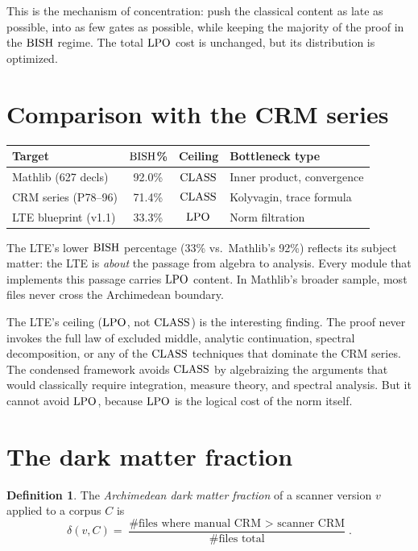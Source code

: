 \documentclass[11pt,a4paper]{article}
\theoremstyle{plain}
\theoremstyle{definition}
\newtheorem{definition}[theorem]{Definition}
\newcommand{\BISH}{\textup{BISH}}
\newcommand{\LPO}{\textup{LPO}}
\newcommand{\CLASS}{\textup{CLASS}}
\begin{document}
This is the mechanism of concentration: push the classical content as
late as possible, into as few gates as possible, while keeping the
majority of the proof in the $\BISH$ regime.  The total $\LPO$ cost
is unchanged, but its distribution is optimized.

\section{Comparison with the CRM series}\label{sec:comparison}

\begin{center}
\begin{tabular}{lccl}
\toprule
\textbf{Target} & \textbf{$\BISH$\%} & \textbf{Ceiling} & \textbf{Bottleneck type} \\
\midrule
Mathlib (627 decls)   & 92.0\% & $\CLASS$ & Inner product, convergence \\
CRM series (P78--96)  & 71.4\% & $\CLASS$ & Kolyvagin, trace formula \\
LTE blueprint (v1.1)  & 33.3\% & $\LPO$  & Norm filtration \\
\bottomrule
\end{tabular}
\end{center}

The LTE's lower $\BISH$ percentage (33\% vs.\ Mathlib's 92\%) reflects
its subject matter: the LTE is \emph{about} the passage from algebra
to analysis.  Every module that implements this passage carries $\LPO$
content.  In Mathlib's broader sample, most files never cross the
Archimedean boundary.

The LTE's ceiling ($\LPO$, not $\CLASS$) is the interesting finding.
The proof never invokes the full law of excluded middle, analytic
continuation, spectral decomposition, or any of the $\CLASS$
techniques that dominate the CRM series.  The condensed framework
avoids $\CLASS$ by algebraizing the arguments that would classically
require integration, measure theory, and spectral analysis.  But it
cannot avoid $\LPO$, because $\LPO$ is the logical cost of the norm
itself.

\section{The dark matter fraction}\label{sec:dark-matter-fraction}

\begin{definition}
The \emph{Archimedean dark matter fraction} of a scanner version $v$
applied to a corpus $C$ is
\[
  \delta(v, C) = \frac{\text{\# files where manual CRM $>$ scanner CRM}}{\text{\# files total}}.
\]
\end{definition}
\end{document}
